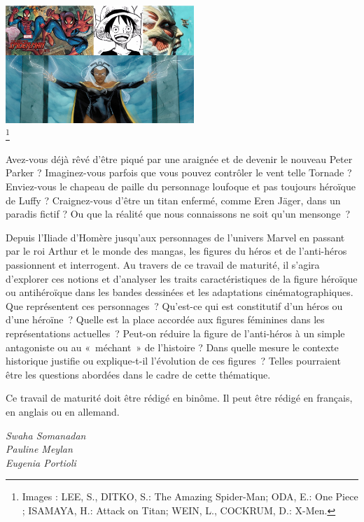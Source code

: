\documentclass[
  10pt,
  french,
  a5paper,
  openany]{book}
\newenvironment{signature}{\begin{flushright}}{\end{flushright}}
\begin{document}
\begin{center}
\includegraphics[width=\textwidth,height=12em]{images/representations-des-figures-heroiques.jpg}\\
\footnote{Images : LEE, S., DITKO, S.: The Amazing Spider-Man; ODA, E.: One Piece ; ISAMAYA, H.: Attack on Titan; WEIN, L., COCKRUM, D.: X-Men.}

\end{center}

Avez-vous déjà rêvé d'être piqué par une araignée et de devenir le nouveau Peter Parker ? Imaginez-vous parfois que vous pouvez contrôler le vent telle Tornade ? Enviez-vous le chapeau de paille du personnage loufoque et pas toujours héroïque de Luffy ? Craignez-vous d'être un titan enfermé, comme Eren Jäger, dans un paradis fictif ? Ou que la réalité que nous connaissons ne soit qu'un mensonge~?

Depuis l'Iliade d'Homère jusqu'aux personnages de l'univers Marvel en passant par le roi Arthur et le monde des mangas, les figures du héros et de l'anti-héros passionnent et interrogent. Au travers de ce travail de maturité, il s'agira d'explorer ces notions et d'analyser les traits caractéristiques de la figure héroïque ou antihéroïque dans les bandes dessinées et les adaptations cinématographiques. Que représentent ces personnages~? Qu'est-ce qui est constitutif d'un héros ou d'une héroïne~? Quelle est la place accordée aux figures féminines dans les représentations actuelles~? Peut-on réduire la figure de l'anti-héros à un simple antagoniste ou au «~méchant~» de l'histoire ? Dans quelle mesure le contexte historique justifie ou explique-t-il l'évolution de ces figures~? Telles pourraient être les questions abordées dans le cadre de cette thématique.

Ce travail de maturité doit être rédigé en binôme. Il peut être rédigé en français, en anglais ou en allemand.

\begin{signature}
\emph{Swaha Somanadan}\\
\emph{Pauline Meylan}\\
\emph{Eugenia Portioli}

\end{signature}
\end{document}
